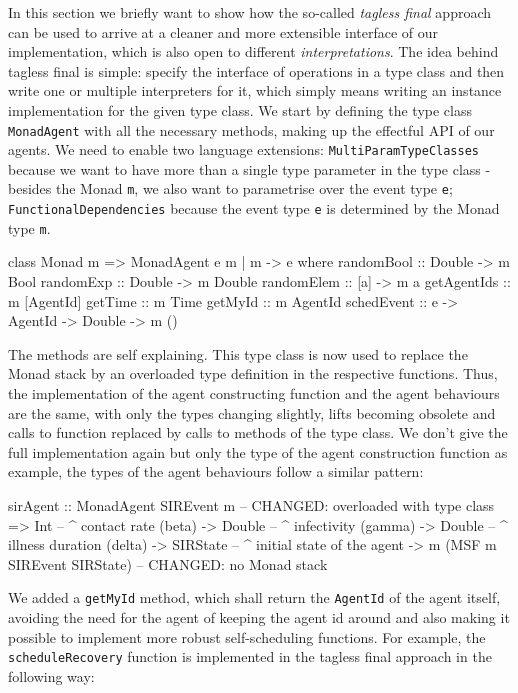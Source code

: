 \medskip

In this section we briefly want to show how the so-called \textit{tagless final} approach \cite{kiselyov_typed_2012} can be used to arrive at a cleaner and more extensible interface of our implementation, which is also open to different \textit{interpretations}. The idea behind tagless final is simple: specify the interface of operations in a type class and then write one or multiple interpreters for it, which simply means writing an instance implementation for the given type class. We start by defining the type class \texttt{MonadAgent} with all the necessary methods, making up the effectful API of our agents. We need to enable two language extensions: \texttt{MultiParamTypeClasses} because we want to have more than a single type parameter in the type class - besides the Monad \texttt{m}, we also want to parametrise over the event type \texttt{e}; \texttt{FunctionalDependencies} because the event type \texttt{e} is determined by the Monad type \texttt{m}.

\begin{HaskellCode}
class Monad m => MonadAgent e m | m -> e where
  randomBool  :: Double -> m Bool
  randomExp   :: Double -> m Double
  randomElem  :: [a] -> m a
  getAgentIds :: m [AgentId]
  getTime     :: m Time
  getMyId     :: m AgentId
  schedEvent  :: e -> AgentId -> Double -> m ()
\end{HaskellCode}

The methods are self explaining. This type class is now used to replace the Monad stack by an overloaded type definition in the respective functions. Thus, the implementation of the agent constructing function and the agent behaviours are the same, with only the types changing slightly, lifts becoming obsolete and calls to function replaced by calls to methods of the type class. We don't give the full implementation again but only the type of the agent construction function as example, the types of the agent behaviours follow a similar pattern: 

\begin{HaskellCode}
sirAgent :: MonadAgent SIREvent m  -- CHANGED: overloaded with type class
         => Int         -- ^ contact rate (beta)
         -> Double      -- ^ infectivity (gamma)
         -> Double      -- ^ illness duration (delta)
         -> SIRState    -- ^ initial state of the agent
         -> m (MSF m SIREvent SIRState) -- CHANGED: no Monad stack
\end{HaskellCode}

We added a \texttt{getMyId} method, which shall return the \texttt{AgentId} of the agent itself, avoiding the need for the agent of keeping the agent id around and also making it possible to implement more robust self-scheduling functions. For example, the \texttt{scheduleRecovery} function is implemented in the tagless final approach in the following way:

